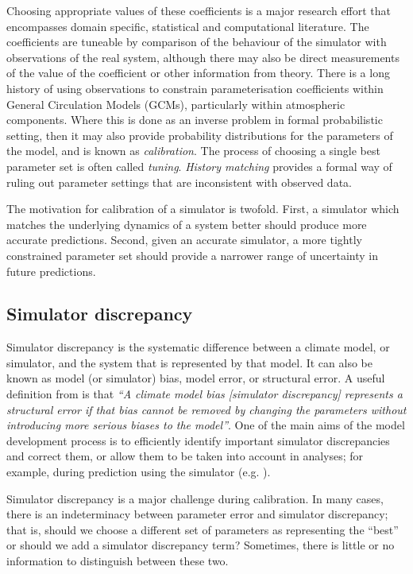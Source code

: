 \documentclass[esd, article]{copernicus} %
\begin{document}
Choosing appropriate values of these coefficients is a major research effort that encompasses domain specific, statistical and computational literature. The coefficients are tuneable by comparison of the behaviour of the simulator with observations of the real system, although there may also be direct measurements of the value of the coefficient or other information from theory. There is a long history of using observations to constrain parameterisation coefficients within General Circulation Models (GCMs), particularly within atmospheric components. Where this is done as an inverse problem in formal probabilistic setting, then it may also provide probability distributions for the parameters of the model, and is known as \emph{calibration}. The process of choosing a single best parameter set is often called \emph{tuning}. \emph{History matching} provides a formal way of ruling out parameter settings that are inconsistent with observed data. 

The motivation for calibration of a simulator is twofold. First, a simulator which matches the underlying dynamics of a system better should produce more accurate predictions. Second, given an accurate simulator, a more tightly constrained parameter set should provide a narrower range of uncertainty in future predictions. 

\subsection{Simulator discrepancy}

Simulator discrepancy is the systematic difference between a climate model, or simulator, and the system that is represented by that model. It can also be known as model (or simulator) bias, model error, or structural error. A useful definition from \cite{williamson2014identifying} is that \emph{``A climate model bias [simulator discrepancy] represents a structural error if that bias cannot be removed by changing the parameters without introducing more serious biases to the model''}. One of the main aims of the model development process is to efficiently identify important simulator discrepancies and correct them, or allow them to be taken into account in analyses; for example, during prediction using the simulator (e.g. \cite{sexton2011multivariate}).

Simulator discrepancy is a major challenge during calibration. In many cases, there is an indeterminacy between parameter error and simulator discrepancy; that is, should we choose a different set of parameters as representing the ``best'' or should we add a simulator discrepancy term? Sometimes, there is little or no information to distinguish between these two.
\end{document}
